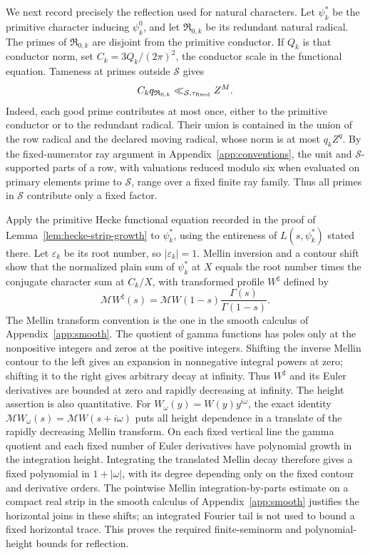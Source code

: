 \documentclass[12pt]{article}
\begin{document}
We next record precisely the reflection used for natural characters.
Let \(\psi_k^*\) be the primitive character inducing \(\psi_k^0\),
and let \(\mathfrak R_{0,k}\) be its redundant natural radical.
The primes of \(\mathfrak R_{0,k}\) are disjoint from the primitive
conductor.  If \(Q_k\) is that conductor norm, set
\(C_k=3Q_k/(2\pi)^2\), the conductor scale in the functional
equation.  Tameness at primes outside \(\mathcal S\) gives
\begin{equation}
 C_kq_{\mathfrak R_{0,k}}
 \ll_{\mathcal S,\tau_{\rm fixed}} Z^M.
 \label{old-eq:2.1c}
\end{equation}
Indeed, each good prime contributes at most once, either to the
primitive conductor or to the redundant radical.  Their union is
contained in the union of the row radical and the declared moving
radical, whose norm is at most \(q_kZ^q\).  By
the fixed-numerator ray argument in Appendix~\ref{app:conventions}, the unit and
\(\mathcal S\)-supported parts of a row, with valuations reduced
modulo six when evaluated on primary elements prime to \(\mathcal S\),
range over a fixed finite ray
family.  Thus all primes in \(\mathcal S\) contribute only a fixed
factor.

Apply the primitive Hecke functional equation recorded in the proof of
Lemma~\ref{lem:hecke-strip-growth} to \(\psi_k^*\), using the entireness of
\(L(s,\psi_k^*)\) stated there.  Let \(\varepsilon_k\) be its root number,
so \(|\varepsilon_k|=1\).  Mellin inversion and a contour shift show that
the normalized plain sum of \(\psi_k^*\) at \(X\) equals the root number times the conjugate
character sum at \(C_k/X\), with transformed profile \(W^\sharp\)
defined by
\[
 \mathcal M W^\sharp(s)
 =\mathcal M W(1-s)\frac{\Gamma(s)}{\Gamma(1-s)}.
\]
The Mellin transform convention is the one in
the smooth calculus of Appendix~\ref{app:smooth}.  The quotient of gamma functions has
poles only at the nonpositive integers and zeros at the positive
integers.  Shifting the inverse Mellin contour to the left gives an
expansion in nonnegative integral powers at zero; shifting it to the
right gives arbitrary decay at infinity.  Thus \(W^\sharp\) and its
Euler derivatives are bounded at zero and rapidly decreasing at
infinity.  The height assertion is also quantitative.  For
\(W_\omega(y)=W(y)y^{i\omega}\), the exact identity
\(\mathcal M W_\omega(s)=\mathcal M W(s+i\omega)\) puts all
height dependence in a translate of the rapidly decreasing Mellin
transform.  On each fixed vertical line the gamma quotient and
each fixed number of Euler derivatives have polynomial growth in
the integration height.  Integrating the translated Mellin decay
therefore gives a fixed polynomial in \(1+|\omega|\), with its
degree depending only on the fixed contour and derivative orders.
The pointwise Mellin integration-by-parts estimate on a compact real
strip in the smooth calculus of Appendix~\ref{app:smooth} justifies the horizontal
joins in these shifts; an integrated Fourier tail is not used to
bound a fixed horizontal trace.  This proves the required
finite-seminorm and polynomial-height bounds for reflection.
\end{document}
